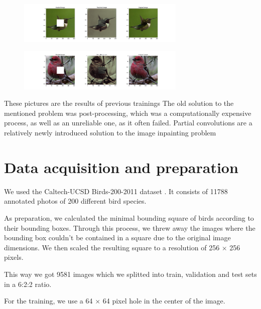 \documentclass[conference]{IEEEtran}
\begin{document}
\begin{figure}[H]
  \centering
  \includegraphics[width=80mm, keepaspectratio]{figures/err_2.png}
\end{figure}

\begin{figure}[H]
  \centering
  \includegraphics[width=80mm, keepaspectratio]{figures/err_3.png}
\end{figure}

These pictures are the results of previous trainings 
The old solution to the mentioned problem was post-processing, which was a computationally expensive process, as well as an unreliable one, as it often failed.
Partial convolutions are a relatively newly introduced solution to the image inpainting problem 

\section{Data acquisition and preparation}
We used the Caltech-UCSD Birds-200-2011 dataset \cite{dataset}. It consists of 11788 annotated photos of 200 different bird species.

As preparation, we calculated the minimal bounding square of birds according to their bounding boxes. Through this process, we threw away the images where the bounding box couldn't be contained in a square due to the original image dimensions. We then scaled the resulting square to a resolution of 256  $\times$ 256 pixels.

This way we got 9581 images which we splitted into train, validation and test sets in a 6:2:2 ratio. 

For the training, we use a 64 $\times$ 64 pixel hole in the center of the image.
\end{document}
